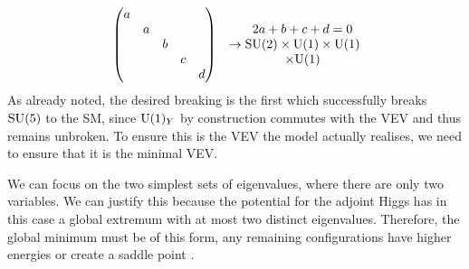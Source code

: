 \begin{align*}
    &\begin{pmatrix} a & & & & \\ & a & & & \\ & & b & & \\ & & & c & \\ & & & & d \end{pmatrix} &\to \begin{matrix} 2a + b + c + d = 0 \\ \mathrm{SU}(2) \times \mathrm{U}(1) \times \mathrm{U}(1) \\\times \mathrm{U}(1) \end{matrix}
\end{align*}
As already noted, the desired breaking is the first which successfully breaks $\mathrm{SU}(5)$ to the SM, since $\mathrm{U}(1)_Y$ by construction commutes with the VEV and thus remains unbroken. To ensure this is the VEV the model actually realises, we need to ensure that it is the minimal VEV. 

We can focus on the two simplest sets of eigenvalues, where there are only two variables. We can justify this because the potential for the adjoint Higgs has in this case a global extremum with at most two distinct eigenvalues. Therefore, the global minimum must be of this form, any remaining configurations have higher energies or create a saddle point \cite{Ruegg:1980gf}. 

